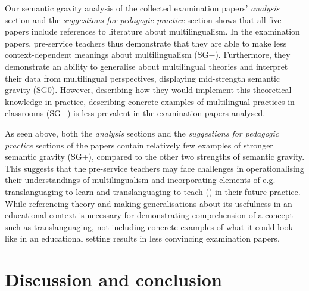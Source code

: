 \documentclass[output=paper]{langscibook}
\begin{document}
Our semantic gravity analysis of the collected examination papers’ \textit{analysis} section and the \textit{suggestions for pedagogic practice} section shows that all five papers include references to literature about multilingualism. In the examination papers, pre-service teachers thus demonstrate that they are able to make less context-dependent meanings about multilingualism (SG−). Furthermore, they demonstrate an ability to generalise about multilingual theories and interpret their data from multilingual perspectives, displaying mid-strength semantic gravity (SG0). However, describing how they would implement this theoretical knowledge in practice, describing concrete examples of multilingual practices in classrooms (SG+) is less prevalent in the examination papers analysed.

As seen above, both the \textit{analysis} sections and the \textit{suggestions for pedagogic practice} sections of the papers contain relatively few examples of stronger semantic gravity (SG+), compared to the other two strengths of semantic gravity. This suggests that the pre-service teachers may face challenges in operationalising their understandings of multilingualism and incorporating elements of e.g. translanguaging to learn and translanguaging to teach (\citealt{Garcia2017-1}) in their future practice. While referencing theory and making generalisations about its usefulness in an educational context is necessary for demonstrating comprehension of a concept such as translanguaging, not including concrete examples of what it could look like in an educational setting results in less convincing examination papers.

\section{Discussion and conclusion}
\end{document}
